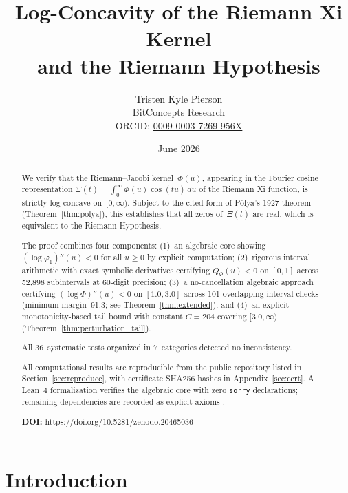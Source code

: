 \documentclass[11pt]{article}
\title{Log-Concavity of the Riemann Xi Kernel\\and the Riemann Hypothesis}
\author{Tristen Kyle Pierson\\
  BitConcepts Research\\
  \small ORCID: \href{https://orcid.org/0009-0003-7269-956X}{0009-0003-7269-956X}}
\date{June 2026}
\theoremstyle{definition}
\theoremstyle{remark}
\newcommand{\doiurl}{\url{https://doi.org/10.5281/zenodo.20465036}}
\begin{document}
\maketitle

\begin{abstract}
We verify that the Riemann--Jacobi kernel~$\Phi(u)$, appearing in the Fourier cosine representation $\Xi(t) = \int_0^\infty \Phi(u)\cos(tu)\,du$ of the Riemann Xi function, is strictly log-concave on~$[0,\infty)$. Subject to the cited form of P\'olya's 1927 theorem (Theorem~\ref{thm:polya}), this establishes that all zeros of~$\Xi(t)$ are real, which is equivalent to the Riemann Hypothesis.

The proof combines four components: (1)~an algebraic core showing $(\log\varphi_1)''(u) < 0$ for all $u \geq 0$ by explicit computation; (2)~rigorous interval arithmetic with exact symbolic derivatives certifying $Q_\Phi(u) < 0$ on $[0,1]$ across 52{,}898 subintervals at 60-digit precision; (3)~a no-cancellation algebraic approach certifying $(\log\Phi)''(u) < 0$ on $[1.0, 3.0]$ across 101 overlapping interval checks (minimum margin~91.3; see Theorem~\ref{thm:extended}); and (4)~an explicit monotonicity-based tail bound with constant $C = 204$ covering $[3.0, \infty)$ (Theorem~\ref{thm:perturbation_tail}).

All 36~systematic tests organized in 7~categories detected no inconsistency.

All computational results are reproducible from the public repository listed in Section~\ref{sec:reproduce}, with certificate SHA256 hashes in Appendix~\ref{sec:cert}. A Lean~4 formalization verifies the algebraic core with zero \texttt{sorry} declarations; remaining dependencies are recorded as explicit axioms .



\medskip\noindent
\textbf{DOI:} \doiurl
\end{abstract}

\section{Introduction}
\label{sec:intro}
\end{document}
